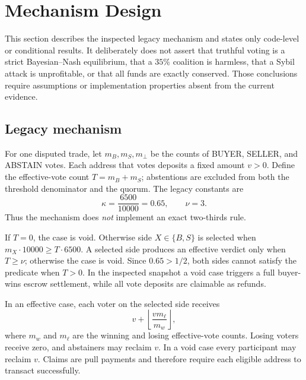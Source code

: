 \section{Mechanism Design}
\label{sec:mech}

This section describes the inspected legacy mechanism and states only code-level or conditional
results. It deliberately does not assert that truthful voting is a strict Bayesian--Nash equilibrium,
that a $35\%$ coalition is harmless, that a Sybil attack is unprofitable, or that all funds are
exactly conserved. Those conclusions require assumptions or implementation properties absent from
the current evidence.

\subsection{Legacy mechanism}
\label{sec:mechanism}

For one disputed trade, let $m_B,m_S,m_\bot$ be the counts of BUYER, SELLER, and ABSTAIN votes.
Each address that votes deposits a fixed amount $v>0$. Define the effective-vote count
$T=m_B+m_S$; abstentions are excluded from both the threshold denominator and the quorum. The legacy
constants are
\[
  \kappa=\frac{6500}{10000}=0.65,\qquad \nu=3.
\]
Thus the mechanism does \emph{not} implement an exact two-thirds rule.

\begin{definition}
\label{def:rule}
If $T=0$, the case is void. Otherwise side $X\in\{B,S\}$ is selected when
$m_X\cdot10000\ge T\cdot6500$. A selected side produces an effective verdict only when
$T\ge\nu$; otherwise the case is void. Since $0.65>1/2$, both sides cannot satisfy the predicate
when $T>0$. In the inspected snapshot a void case triggers a full buyer-wins escrow settlement, while
all vote deposits are claimable as refunds.
\end{definition}

\begin{definition}
\label{def:settlement}
In an effective case, each voter on the selected side receives
\[
  v+\left\lfloor\frac{v m_\ell}{m_w}\right\rfloor,
\]
where $m_w$ and $m_\ell$ are the winning and losing effective-vote counts. Losing voters receive
zero, and abstainers may reclaim $v$. In a void case every participant may reclaim $v$. Claims are
pull payments and therefore require each eligible address to transact successfully.
\end{definition}


